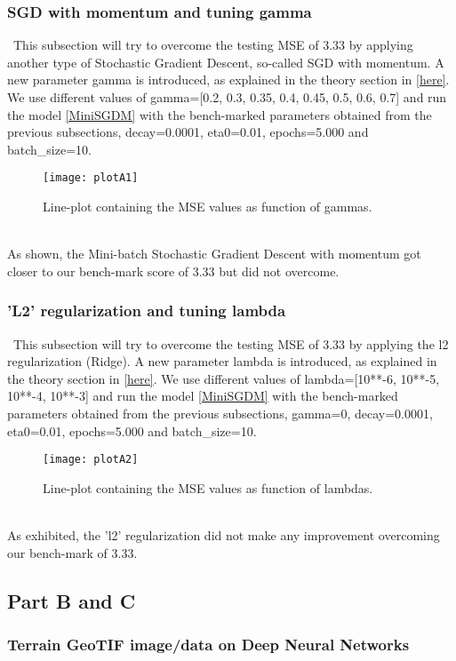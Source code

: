 \subsubsection{SGD with momentum and tuning gamma}
\label{chap:SGD with momentum and tuning gamma}

\qquad \, This subsection will try to overcome the testing MSE of 3.33 by applying another type of Stochastic Gradient Descent, so-called SGD with momentum. A new parameter gamma is introduced, as explained in the theory section in \hyperref[chap:Stochastic Gradient Decedent]{[here]}. We use different values of gamma=[0.2, 0.3, 0.35, 0.4, 0.45, 0.5, 0.6, 0.7] and run the model \href{https://github.com/fabiorodp/UiO-FYS-STK4155/blob/master/Project2/package/gradient_descent.py}{[MiniSGDM]} with the bench-marked parameters obtained from the previous subsections, decay=0.0001, eta0=0.01, epochs=5.000 and batch\_size=10.\\

\begin{figure}[H]
\label{fig:figA6}
\centering
\texttt{[image: plotA1]}
\caption{Line-plot containing the MSE values as function of gammas.}
\end{figure}\\

As shown, the Mini-batch Stochastic Gradient Descent with momentum got closer to our bench-mark score of 3.33 but did not overcome.\\

\subsubsection{'L2' regularization and tuning lambda}
\label{chap:'L2' regularization and tuning lambda}

\qquad \, This subsection will try to overcome the testing MSE of 3.33 by applying the l2 regularization (Ridge). A new parameter lambda is introduced, as explained in the theory section in \hyperref[chap:Stochastic Gradient Decedent]{[here]}. We use different values of lambda=[10**-6, 10**-5, 10**-4, 10**-3] and run the model \href{https://github.com/fabiorodp/UiO-FYS-STK4155/blob/master/Project2/package/gradient_descent.py}{[MiniSGDM]} with the bench-marked parameters obtained from the previous subsections, gamma=0, decay=0.0001, eta0=0.01, epochs=5.000 and batch\_size=10.\\

\begin{figure}[H]
\label{fig:figA7}
\centering
\texttt{[image: plotA2]}
\caption{Line-plot containing the MSE values as function of lambdas.}
\end{figure}\\

As exhibited, the 'l2' regularization did not make any improvement overcoming our bench-mark of 3.33.\\

\subsection{Part B and C}
\label{chap:Part B and C}

\subsubsection{Terrain GeoTIF image/data on Deep Neural Networks}
\label{chap:Terrain GeoTIF image/data on Deep Neural Networks}

